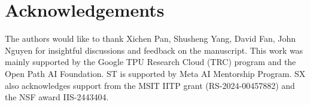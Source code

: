 \documentclass[10pt,twocolumn,letterpaper]{article}
\begin{document}
\section{Acknowledgements}
The authors would like to thank Xichen Pan, Shusheng Yang, David Fan, John Nguyen for insightful discussions and
feedback on the manuscript. This work was mainly supported by the Google TPU Research Cloud
(TRC) program and the Open Path AI Foundation. ST is supported by Meta AI Mentorship Program.
SX also acknowledges support from the MSIT IITP grant (RS-2024-00457882) and the NSF award
IIS-2443404.












\clearpage
{
    \small
    
    
}

\clearpage
\end{document}
